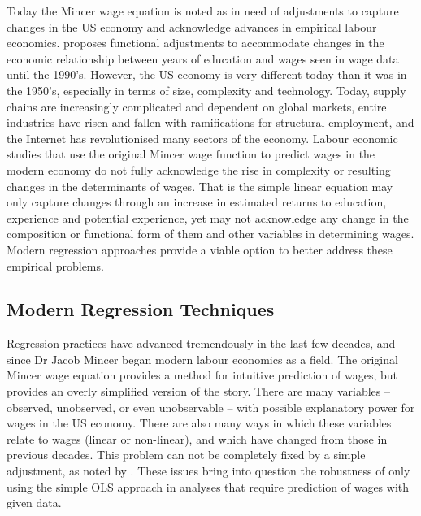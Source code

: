 \documentclass[notitlepage,12pt]{article}
\begin{document}
Today the Mincer wage equation is noted as in need of adjustments to capture changes in the US economy and acknowledge advances in empirical labour economics.  \cite{lemieux2006mincer} proposes functional adjustments to accommodate changes in the economic relationship between years of education and wages seen in wage data until the 1990's.  However, the US economy is very different today than it was in the 1950's, especially in terms of size, complexity and technology.  Today, supply chains are increasingly complicated and dependent on global markets, entire industries have risen and fallen with ramifications for structural employment, and the Internet has revolutionised many sectors of the economy.  Labour economic studies that use the original Mincer wage function to predict wages in the modern economy do not fully acknowledge the rise in complexity or resulting changes in the determinants of wages.  That is the simple linear equation may only capture changes through an increase in estimated returns to education, experience and potential experience, yet may not acknowledge any change in the composition or functional form of them and other variables in determining wages.  Modern regression approaches provide a viable option to better address these empirical problems.

\subsection{Modern Regression Techniques}

Regression practices have advanced tremendously in the last few decades, and since Dr Jacob Mincer began modern labour economics as a field.  The original Mincer wage equation provides a method for intuitive prediction of wages, but provides an overly simplified version of the story.  There are many variables -- observed, unobserved, or even unobservable -- with possible explanatory power for wages in the US economy.  There are also many ways in which these variables relate to wages (linear or non-linear), and which have changed from those in previous decades.  This problem can not be completely fixed by a simple adjustment, as noted by \cite{lemieux2006increasing}.  These issues bring into question the robustness of only using the simple OLS approach in analyses that require prediction of wages with given data.
\end{document}

